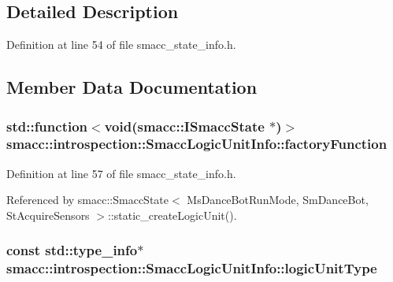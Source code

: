 \subsection{Detailed Description}


Definition at line 54 of file smacc\+\_\+state\+\_\+info.\+h.



\subsection{Member Data Documentation}
\subsubsection[{\texorpdfstring{factory\+Function}{factoryFunction}}]{\setlength{\rightskip}{0pt plus 5cm}std\+::function$<$void({\bf smacc\+::\+I\+Smacc\+State} $\ast$)$>$ smacc\+::introspection\+::\+Smacc\+Logic\+Unit\+Info\+::factory\+Function}\hypertarget{structsmacc_1_1introspection_1_1SmaccLogicUnitInfo_ad98da99b4913a3dcad4309005cf30072}{}\label{structsmacc_1_1introspection_1_1SmaccLogicUnitInfo_ad98da99b4913a3dcad4309005cf30072}


Definition at line 57 of file smacc\+\_\+state\+\_\+info.\+h.



Referenced by smacc\+::\+Smacc\+State$<$ Ms\+Dance\+Bot\+Run\+Mode, Sm\+Dance\+Bot, St\+Acquire\+Sensors $>$\+::static\+\_\+create\+Logic\+Unit().

\subsubsection[{\texorpdfstring{logic\+Unit\+Type}{logicUnitType}}]{\setlength{\rightskip}{0pt plus 5cm}const std\+::type\+\_\+info$\ast$ smacc\+::introspection\+::\+Smacc\+Logic\+Unit\+Info\+::logic\+Unit\+Type}\hypertarget{structsmacc_1_1introspection_1_1SmaccLogicUnitInfo_af399d58635280862b10116c76cb6e0f8}{}\label{structsmacc_1_1introspection_1_1SmaccLogicUnitInfo_af399d58635280862b10116c76cb6e0f8}


